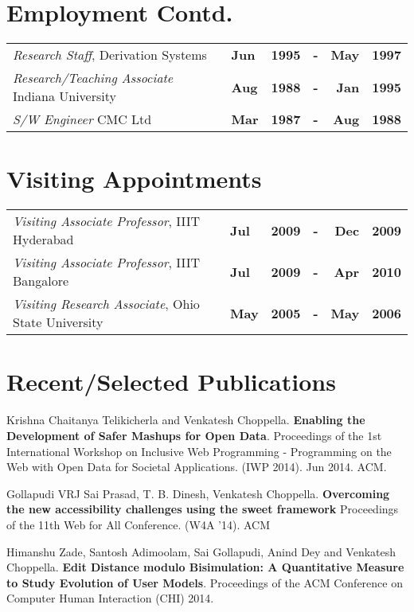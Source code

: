 \documentclass[11pt,margin,line]{res}
\begin{document}
\begin{resume}
\section{\sc Employment Contd.}
\begin{tabular}{lllcrr}
{\em Research Staff}, Derivation Systems & {\bf
  Jun\/} & {\bf 1995\/} &  {\bf -\/}  & {\bf May\/} & {\bf
  1997\/}\T\\ %
{\em Research/Teaching Associate} Indiana University & {\bf Aug}
  & {\bf 1988\/} &  {\bf -\/}  & {\bf Jan\/} & {\bf 1995\/}\T\\ %
{\em S/W Engineer} CMC Ltd & {\bf Mar} & {\bf 1987\/} &  {\bf
  -\/}  & {\bf Aug\/} & {\bf 1988\/}\T%
\end{tabular}

\vspace{3em}

\section{\sc Visiting Appointments}
\begin{tabular}{lllcrr}
{\em Visiting Associate Professor}, IIIT Hyderabad & {\bf
  Jul} & {\bf 2009\/} & {\bf -} & {\bf Dec } & {\bf 2009}\T\\
{\em Visiting Associate Professor}, IIIT Bangalore & {\bf
  Jul} & {\bf 2009\/} & {\bf -} & {\bf Apr } & {\bf 2010}\T\\
{\em Visiting Research Associate}, Ohio State University & {\bf
  May} & {\bf 2005\/} & {\bf -} & {\bf May } & {\bf 2006}\T\\
\end{tabular}

\section{\sc Recent/Selected Publications}

Krishna Chaitanya Telikicherla and Venkatesh Choppella.
{\bf Enabling the Development of Safer Mashups for Open
  Data}.  Proceedings of the 1st International Workshop on
Inclusive Web Programming - Programming on the Web with Open
Data for Societal Applications.  (IWP 2014).  Jun 2014.
ACM.

Gollapudi VRJ Sai Prasad, T. B. Dinesh, Venkatesh Choppella.
{\bf Overcoming the new accessibility challenges using the
  sweet framework} Proceedings of the 11th Web for All
Conference.  (W4A '14).  ACM

Himanshu Zade, Santosh Adimoolam, Sai Gollapudi, Anind Dey
and Venkatesh Choppella.  {\bf Edit Distance modulo
  Bisimulation: A Quantitative Measure to Study Evolution of
  User Models}.  Proceedings of the ACM Conference on
Computer Human Interaction (CHI) 2014.


\end{resume}
\end{document}
